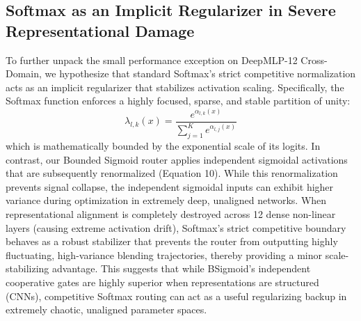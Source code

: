 \subsection{Softmax as an Implicit Regularizer in Severe Representational Damage}

To further unpack the small performance exception on DeepMLP-12 Cross-Domain, we hypothesize that standard Softmax's strict competitive normalization acts as an implicit regularizer that stabilizes activation scaling. Specifically, the Softmax function enforces a highly focused, sparse, and stable partition of unity:
\begin{equation}
\lambda_{l, k}(x) = \frac{e^{\alpha_{l, k}(x)}}{\sum_{j=1}^K e^{\alpha_{l, j}(x)}}
\end{equation}
which is mathematically bounded by the exponential scale of its logits. In contrast, our Bounded Sigmoid router applies independent sigmoidal activations that are subsequently renormalized (Equation 10). While this renormalization prevents signal collapse, the independent sigmoidal inputs can exhibit higher variance during optimization in extremely deep, unaligned networks. When representational alignment is completely destroyed across 12 dense non-linear layers (causing extreme activation drift), Softmax's strict competitive boundary behaves as a robust stabilizer that prevents the router from outputting highly fluctuating, high-variance blending trajectories, thereby providing a minor scale-stabilizing advantage. This suggests that while BSigmoid's independent cooperative gates are highly superior when representations are structured (CNNs), competitive Softmax routing can act as a useful regularizing backup in extremely chaotic, unaligned parameter spaces.

